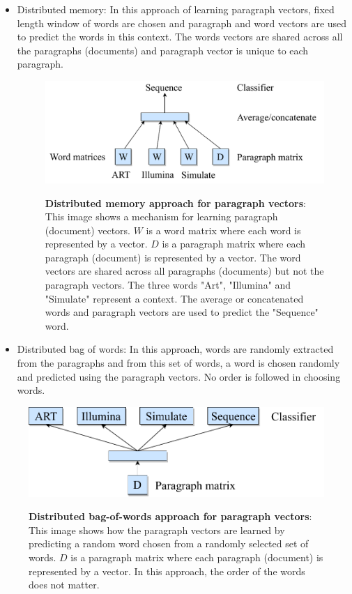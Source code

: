 \begin{itemize}
\item Distributed memory: In this approach of learning paragraph vectors, fixed length window of words are chosen and paragraph and word vectors are used to predict the words in this context. The words vectors are shared across all the paragraphs (documents) and paragraph vector is unique to each paragraph.

\begin{figure}[h]
\begin{centering}
    {\includegraphics[scale=0.7]{figures/dm_pv.pdf}}
    \caption[Distributed memory approach for paragraph vectors]{\textbf{Distributed memory approach for paragraph vectors}: This image shows a mechanism for learning paragraph (document) vectors. $W$ is a word matrix where each word is represented by a vector. $D$ is a paragraph matrix where each paragraph (document) is represented by a vector. The word vectors are shared across all paragraphs (documents) but not the paragraph vectors. The three words "Art", "Illumina" and "Simulate" represent a context. The average or concatenated words and paragraph vectors are used to predict the "Sequence" word.}
\end{centering}
\end{figure}

\item Distributed bag of words: In this approach, words are randomly extracted from the paragraphs and from this set of words, a word is chosen randomly and predicted using the paragraph vectors. No order is followed in choosing words.
\end{itemize}

\begin{figure}[h]
\begin{centering}
    {\includegraphics[scale=0.7]{figures/dbow_pv.pdf}}
    \caption[Distributed bag-of-words approach for paragraph vectors]{\textbf{Distributed bag-of-words approach for paragraph vectors}: This image shows how the paragraph vectors are learned by predicting a random word chosen from a randomly selected set of words. $D$ is a paragraph matrix where each paragraph (document) is represented by a vector. In this approach, the order of the words does not matter.}
\end{centering}
\end{figure}

